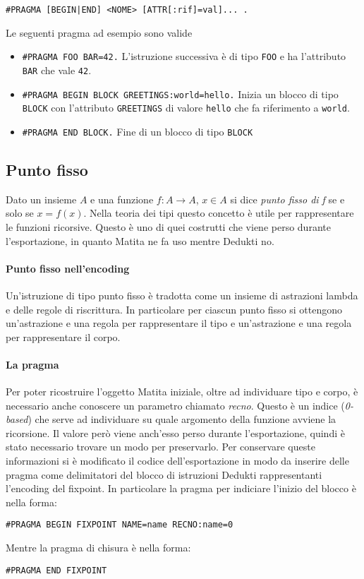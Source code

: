 \documentclass[12pt,a4paper]{report}
\begin{document}
\begin{center}
  \texttt{\#PRAGMA [BEGIN|END] <NOME> [ATTR[:rif]=val]... .}
\end{center}
Le seguenti pragma ad esempio sono valide
\begin{itemize}
  \item  \texttt{\#PRAGMA FOO BAR=42.} L'istruzione successiva è di tipo
\texttt{FOO} e ha l'attributo \texttt{BAR} che vale \texttt{42}.
  \item  \texttt{\#PRAGMA BEGIN BLOCK GREETINGS:world=hello.} Inizia un blocco di
    tipo \texttt{BLOCK} con l'attributo \texttt{GREETINGS} di valore \texttt{hello}
    che fa riferimento a \texttt{world}.
  \item  \texttt{\#PRAGMA END BLOCK.} Fine di un blocco di tipo \texttt{BLOCK}
\end{itemize}

\subsection{Punto fisso}
Dato un insieme $A$ e una funzione $f: A \rightarrow A$, $x \in A$ si dice
\textit{punto fisso di f} se e solo se $x = f(x)$. Nella teoria dei tipi 
questo concetto è utile per rappresentare le funzioni ricorsive.
Questo è uno di quei costrutti che viene perso durante l'esportazione, in 
quanto Matita ne fa uso mentre Dedukti no.

\paragraph{Punto fisso nell'encoding} Un'istruzione di tipo punto fisso è tradotta
come un insieme di astrazioni lambda e delle regole di riscrittura. In particolare
per ciascun punto fisso si ottengono un'astrazione e una regola per rappresentare
il tipo e un'astrazione e una regola per rappresentare il corpo.

\paragraph{La pragma} Per poter ricostruire l'oggetto Matita iniziale, oltre
ad individuare tipo e corpo, è necessario anche conoscere un parametro chiamato
\textit{recno}. Questo è un indice (\textit{0-based}) che serve ad individuare
su quale argomento della funzione avviene la ricorsione. Il valore però viene
anch'esso perso durante l'esportazione, quindi è stato necessario trovare un
modo per preservarlo. Per conservare queste informazioni si è modificato il
codice dell'esportazione in modo da inserire delle pragma come delimitatori
del blocco di istruzioni Dedukti rappresentanti l'encoding del fixpoint.
In particolare la pragma per indiciare l'inizio del blocco è nella forma:
\begin{center}
\texttt{\#PRAGMA BEGIN FIXPOINT NAME=name RECNO:name=0}
\end{center}
Mentre la pragma di chisura è nella forma:
\begin{center}
\texttt{\#PRAGMA END FIXPOINT}
\end{center}
\end{document}
